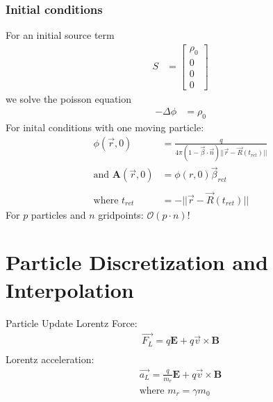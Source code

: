 \documentclass[5pt]{beamer}
\begin{document}
\begin{frame}
\frametitle{Initial conditions}
For an initial source term
\begin{align*}
S &= \begin{bmatrix} \rho_0 \\ 0 \\ 0 \\ 0 \end{bmatrix}
\end{align*}
we solve the poisson equation
\begin{align*}
-\Delta \phi &= \rho_0
\end{align*}
\pause
For inital conditions with one moving particle:
\begin{align*}
\phi(\vec{r}, 0) &= \frac{q}{4 \pi(1 - \vec{\beta} \cdot \vec{n}) ||\vec{r} - \vec{R}(t_{ret})||} \\
\text{and } \mathbf{A}(\vec{r}, 0) &= \phi(r, 0) \vec{\beta}_{ret} \\ \\
\text{where } t_{ret} &= -||\vec{r} - \vec{R}(t_{ret})|| 
\end{align*}
\pause
For $p$ particles and $n$ gridpoints: $\mathcal{O}(p\cdot n)$!
\end{frame}
\section{Particle Discretization and Interpolation}
\frame[noframenumbering]{\tableofcontents[currentsection]}
\begin{frame}
  {\huge Particle Update}
  Lorentz Force:
\begin{align*}
  \vec{F_L} = q \mathbf{E} + q \vec{v} \times \mathbf{B} \\
\end{align*}
Lorentz acceleration:
\begin{align*}
  \vec{a_L} = \frac{q}{m_r} \mathbf{E} + q \vec{v} \times \mathbf{B} \\
  \text{where } m_r = \gamma m_0
\end{align*}
\end{frame}
\end{document}
